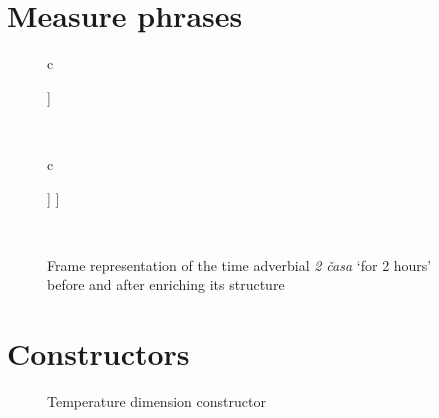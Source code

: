 \section{Measure phrases}\label{app:measure}
\begin{figure}[H]
\begin{tabular}[t]{c}
\begin{forest}
[NumP\textsuperscript{[I=\textbf{f}]}
[Num] [N]
]
\end{forest}\\
\end{tabular}
\hfill
\begin{tabular}[t]{c}
\begin{forest}
[VP\textsuperscript{[E=\textbf{e}]}
  [VP*]
  [NumP\textsuperscript{[I=\textbf{f}]}
    [Num] [N]
  ]
]
\end{forest}\\
\end{tabular}
\caption{Frame representation of the time adverbial \textit{2 \v{c}asa} `for 2 hours' before and after enriching its structure \label{app:2hours}}
\end{figure}

\section{Constructors}\label{app:constructors}

\begin{figure}[H]
\begin{minipage}{0.6\textwidth}
\end{minipage}
\begin{minipage}{0.35\textwidth}
\end{minipage}
\caption{Temperature dimension constructor\label{app:temp}}
\end{figure}

